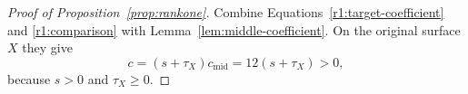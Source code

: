 \begin{proof}[Proof of Proposition~\ref{prop:rankone}]
Combine Equations~\eqref{r1:target-coefficient} and
\eqref{r1:comparison} with Lemma~\ref{lem:middle-coefficient}.  On
the original surface $X$ they give
\[
 c=(s+\tau_X)c_{\mathrm{mid}}=12(s+\tau_X)>0,
\]
because $s>0$ and $\tau_X\geq0$.
\end{proof}
